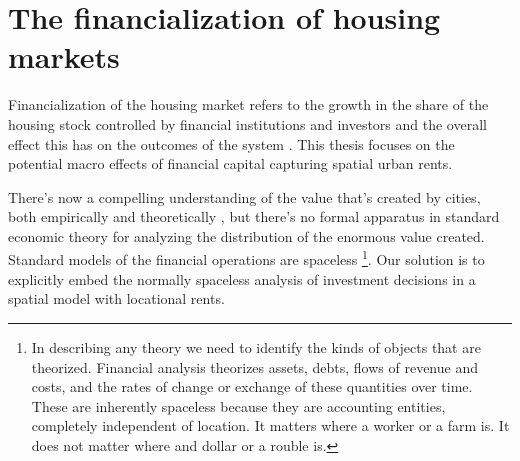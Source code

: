 \section{The financialization of housing markets}
Financialization of the housing market refers to the growth in the share of the housing stock controlled by financial institutions and investors and the overall effect this has on the outcomes of the system \cite{farhaReportFinancializationHousing2017, hansenFinanceCapitalismFinancialization2014}. 
This thesis focuses on the potential macro effects of financial capital capturing spatial urban rents. 





There's now a compelling understanding of the value that's created by cities, both empirically and theoretically \cite{jacobsEconomyCities1969, spenceUrbanizationGrowth2009, bettencourtIntroductionUrbanScience2021}, but there's no formal apparatus in standard economic theory for analyzing the distribution of the enormous value created. %
Standard models of the financial operations are spaceless \footnote{In describing any theory we need to identify the kinds of objects that are theorized. Financial analysis theorizes  assets, debts, flows of revenue and costs, and the rates of change or exchange of these quantities over time. These are inherently spaceless because they are accounting entities, completely independent of location. It matters where a worker or a farm is. It does not matter where and dollar or a rouble is.}. 
Our solution is to explicitly embed the normally spaceless analysis of investment decisions in a spatial model with locational rents. %

